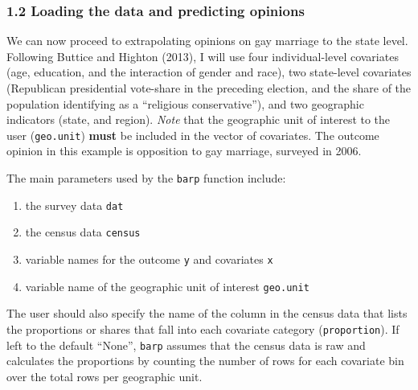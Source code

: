 \documentclass[]{article}
\providecommand{\tightlist}{%
  \setlength{\itemsep}{0pt}\setlength{\parskip}{0pt}}
\begin{document}
\subsubsection{1.2 Loading the data and predicting
opinions}\label{loading-the-data-and-predicting-opinions}

We can now proceed to extrapolating opinions on gay marriage to the
state level. Following Buttice and Highton (2013), I will use four
individual-level covariates (age, education, and the interaction of
gender and race), two state-level covariates (Republican presidential
vote-share in the preceding election, and the share of the population
identifying as a ``religious conservative''), and two geographic
indicators (state, and region). \emph{Note} that the geographic unit of
interest to the user (\texttt{geo.unit}) \textbf{must} be included in
the vector of covariates. The outcome opinion in this example is
opposition to gay marriage, surveyed in 2006.

The main parameters used by the \texttt{barp} function include:

\begin{enumerate}
\def\labelenumi{\arabic{enumi}.}
\tightlist
\item
  the survey data \texttt{dat}
\item
  the census data \texttt{census}
\item
  variable names for the outcome \texttt{y} and covariates \texttt{x}
\item
  variable name of the geographic unit of interest \texttt{geo.unit}
\end{enumerate}

The user should also specify the name of the column in the census data
that lists the proportions or shares that fall into each covariate
category (\texttt{proportion}). If left to the default ``None'',
\texttt{barp} assumes that the census data is raw and calculates the
proportions by counting the number of rows for each covariate bin over
the total rows per geographic unit.
\end{document}
